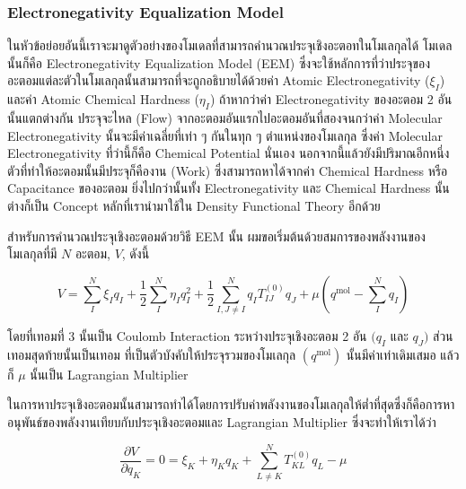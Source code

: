 \subsubsection{Electronegativity Equalization Model}

ในหัวข้อย่อยอันนี้เราจะมาดูตัวอย่างของโมเดลที่สามารถคำนวณประจุเชิงอะตอทในโมเลกุลได้ โมเดลนั้นก็คือ Electronegativity Equalization
Model (EEM) ซึ่งจะใช้หลักการที่ว่าประจุของอะตอมแต่ละตัวในโมเลกุลนั้นสามารถที่จะถูกอธิบายได้ด้วยค่า Atomic Electronegativity ($\xi_{I}$)
และค่า Atomic Chemical Hardness ($\eta_{I}$) ถ้าหากว่าค่า Electronegativity ของอะตอม 2 อันนั้นแตกต่างกัน ประจุจะไหล (Flow)
จากอะตอมอันแรกไปอะตอมอันที่สองจนกว่าค่า Molecular Electronegativity นั้นจะมีค่าเฉลี่ยที่เท่า ๆ กันในทุก ๆ ตำแหน่งของโมเลกุล%
\autocite{mortier1986,ionescu2013} ซึ่งค่า Molecular Electronegativity ที่ว่านี้ก็คือ Chemical Potential นั่นเอง
นอกจากนี้แล้วยังมีปริมาณอีกหนึ่งตัวที่ทำให้อะตอมนั้นมีประจุก็คืองาน (Work) ซึ่งสามารถหาได้จากค่า Chemical Hardness หรือ Capacitance
ของอะตอม ยิ่งไปกว่านั้นทั้ง Electronegativity และ Chemical Hardness นั้นต่างก็เป็น Concept หลักที่เรานำมาใช้ใน Density Functional
Theory อีกด้วย\autocite{parr1994a,yang1998}

สำหรับการคำนวณประจุเชิงอะตอมด้วยวิธี EEM นั้น ผมขอเริ่มต้นด้วยสมการของพลังงานของโมเลกุลที่มี $N$ อะตอม, $V$, ดังนี้

\begin{equation}
  V
  =
  \sum_I^N \xi_I q_I+\frac{1}{2}
  \sum_I^N \eta_I q_I^2+\frac{1}{2}
  \sum_{I, J \neq I}^N q_I T_{I J}^{(0)} q_J
  + \mu\left(q^{\mathrm{mol}}-\sum_I^N q_I\right)
\end{equation}

\noindent โดยที่เทอมที่ 3 นั้นเป็น Coulomb Interaction ระหว่างประจุเชิงอะตอม 2 อัน $(q_I$ และ $q_J)$ ส่วนเทอมสุดท้ายนั้นเป็นเทอม%
ที่เป็นตัวบังคับให้ประจุรวมของโมเลกุล $(q^{\mathrm{mol}})$ นั้นมีค่าเท่าเดิมเสมอ แล้วก็ $\mu$ นั้นเป็น Lagrangian Multiplier

ในการหาประจุเชิงอะตอมนั้นสามารถทำได้โดยการปรับค่าพลังงานของโมเลกุลให้ต่ำที่สุดซึ่งก็คือการหาอนุพันธ์ของพลังงานเทียบกับประจุเชิงอะตอมและ
Lagrangian Multiplier ซึ่งจะทำให้เราได้ว่า

\begin{equation}
  \frac{\partial V}{\partial q_K}
  =
  0
  = \xi_K+\eta_K q_K+\sum_{L \neq K}^N T_{K L}^{(0)} q_L-\mu
\end{equation}

